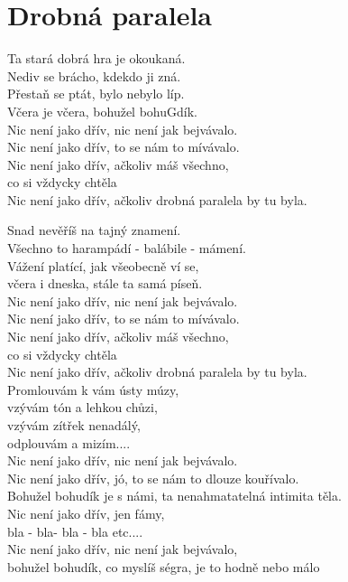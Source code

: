 \section{Drobná paralela}
\onehalfspacing

Ta stará dobrá hra je okoukaná. \\
Nediv se brácho, kdekdo ji zná. \\
Přestaň se ptát, bylo nebylo líp. \\
Včera je včera, bohužel bohuGdík. \\

{}Nic není jako dřív, nic není jak bejvávalo. \\
Nic není jako dřív, to se nám to mívávalo. \\
Nic není jako dřív, ačkoliv máš všechno, \\
co si vždycky chtěla \\
Nic není jako dřív, ačkoliv drobná paralela by tu byla. \\

\begin{multicols}{2}
\singlespacing

\sloka{}

Snad nevěříš na tajný znamení. \\
Všechno to harampádí - balábile - mámení. \\
Vážení platící, jak všeobecně ví se, \\
včera i dneska, stále ta samá píseň. \\

Nic není jako dřív, nic není jak bejvávalo. \\
Nic není jako dřív, to se nám to mívávalo. \\
Nic není jako dřív, ačkoliv máš všechno, \\
co si vždycky chtěla \\
Nic není jako dřív, ačkoliv drobná paralela by tu byla. \\

Promlouvám k vám ústy múzy, \\
vzývám tón a lehkou chůzi, \\
vzývám zítřek nenadálý, \\
odplouvám a mizím.... \\

Nic není jako dřív, nic není jak bejvávalo. \\
Nic není jako dřív, jó, to se nám to dlouze kouřívalo. \\
Bohužel bohudík je s námi, ta nenahmatatelná intimita těla. \\
Nic není jako dřív, jen fámy, \\
bla - bla- bla - bla etc....\\

Nic není jako dřív, nic není jak bejvávalo, \\
bohužel bohudík, co myslíš ségra, je to hodně nebo málo\\ 
\end{multicols}